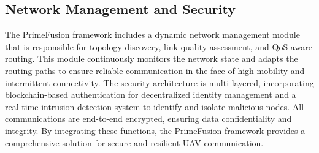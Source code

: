 \subsection{Network Management and Security}
The PrimeFusion framework includes a dynamic network management module that is responsible for topology discovery, link quality assessment, and QoS-aware routing. This module continuously monitors the network state and adapts the routing paths to ensure reliable communication in the face of high mobility and intermittent connectivity. The security architecture is multi-layered, incorporating blockchain-based authentication for decentralized identity management and a real-time intrusion detection system to identify and isolate malicious nodes. All communications are end-to-end encrypted, ensuring data confidentiality and integrity. By integrating these functions, the PrimeFusion framework provides a comprehensive solution for secure and resilient UAV communication.

